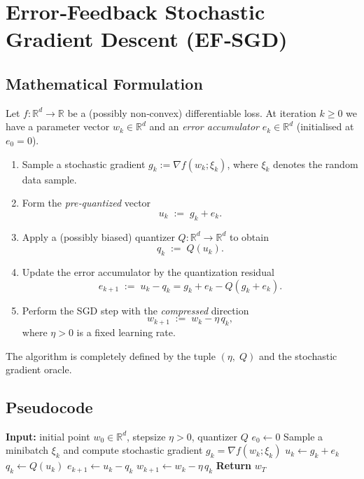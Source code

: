 \documentclass{article}
\newcommand{\R}{\mathbb{R}}
\begin{document}
\section*{Error‑Feedback Stochastic Gradient Descent (EF‑SGD)}

\subsection*{Mathematical Formulation}
Let $f:\R^{d}\rightarrow\R$ be a (possibly non‑convex) differentiable loss.  
At iteration $k\ge 0$ we have a parameter vector $w_k\in\R^{d}$ and an
\emph{error accumulator} $e_k\in\R^{d}$ (initialised at $e_0=0$).  

\begin{enumerate}[label=\arabic*)]
\item Sample a stochastic gradient $g_k:=\nabla f(w_k;\xi_k)$, where
$\xi_k$ denotes the random data sample.
\item Form the \emph{pre‑quantized} vector
\[
u_k \;:=\; g_k+e_k .\tag{1}
\]
\item Apply a (possibly biased) quantizer $Q:\R^{d}\rightarrow\R^{d}$ to obtain
\[
q_k \;:=\; Q(u_k). \tag{2}
\]
\item Update the error accumulator by the quantization residual
\[
e_{k+1}\;:=\; u_k-q_k = g_k+e_k-Q(g_k+e_k). \tag{3}
\]
\item Perform the SGD step with the \emph{compressed} direction
\[
w_{k+1}\;:=\; w_k-\eta\, q_k, \tag{4}
\]
where $\eta>0$ is a fixed learning rate.
\end{enumerate}

The algorithm is completely defined by the tuple
$(\eta,\;Q)$ and the stochastic gradient oracle.

\subsection*{Pseudocode}
\begin{algorithm}[H]
\caption{Error‑Feedback SGD (EF‑SGD)}\label{alg:efsgd}
\begin{algorithmic}[1]
\STATE \textbf{Input:} initial point $w_0\in\R^d$, stepsize $\eta>0$, quantizer $Q$
\STATE $e_0\gets 0$
    \STATE Sample a minibatch $\xi_k$ and compute stochastic gradient $g_k=\nabla f(w_k;\xi_k)$
    \STATE $u_k \gets g_k+e_k$ \hfill{}
    \STATE $q_k \gets Q(u_k)$ \hfill{}
    \STATE $e_{k+1}\gets u_k-q_k$ \hfill{}
    \STATE $w_{k+1}\gets w_k-\eta\, q_k$ \hfill{}
\ENDFOR
\STATE \textbf{Return} $w_T$
\end{algorithmic}
\end{algorithm}
\end{document}
